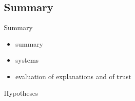 \subsection{Summary}
Summary\newline
\begin{itemize}
	\item summary 
	\item systems
	\item evaluation of explanations and of trust
\end{itemize}
Hypotheses













